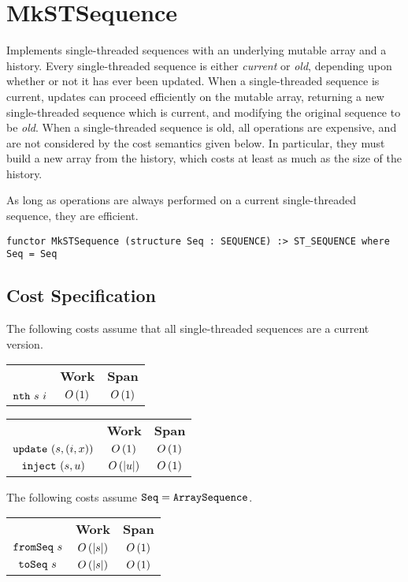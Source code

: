 \chapter{MkSTSequence}
\label{ch:st-seq}
\begin{preamble}
Implements single-threaded sequences with an underlying mutable array and a
history.
Every single-threaded sequence is either \emph{current} or \emph{old},
depending upon whether or not it has ever been updated.
When a single-threaded sequence is current, updates can proceed efficiently
on the mutable array, returning a new single-threaded sequence which is
current, and modifying the original sequence to be \emph{old}.
When a single-threaded sequence is old, all operations are expensive, and
are not considered by the cost semantics given below. In particular, they
must build a new array from the history, which costs at least as much as the
size of the history.

As long as operations are always performed on a current
single-threaded sequence, they are efficient.
\begin{verbatim}
functor MkSTSequence (structure Seq : SEQUENCE) :> ST_SEQUENCE where Seq = Seq
\end{verbatim}
\end{preamble}

\section{Cost Specification}

\begin{gram}
The following costs assume that all single-threaded sequences are a current
version.
\end{gram}

\begin{costspec}[Indexing]
\begin{tabular}{ccc}
& \textbf{Work} & \textbf{Span} \\
$\texttt{nth}~s~i$ & $O\left({1}\right)$ & $O\left({1}\right)$
\end{tabular}
\end{costspec}

\begin{costspec}[Updates]
\begin{tabular}{ccc}
& \textbf{Work} & \textbf{Span} \\
$\texttt{update}~(s,(i,x))$ & $O\left({1}\right)$ & $O\left({1}\right)$ \\
$\texttt{inject}~(s,u)$ & $O\left({|u|}\right)$ & $O\left({1}\right)$
\end{tabular}
\end{costspec}

\begin{costspec}[Conversion]
The following costs assume $\texttt{Seq} = \texttt{ArraySequence}$.
\begin{tabular}{ccc}
& \textbf{Work} & \textbf{Span} \\
$\texttt{fromSeq}~s$ & $O\left({|s|}\right)$ & $O\left({1}\right)$ \\
$\texttt{toSeq}~s$ & $O\left({|s|}\right)$ & $O\left({1}\right)$
\end{tabular}
\end{costspec}

